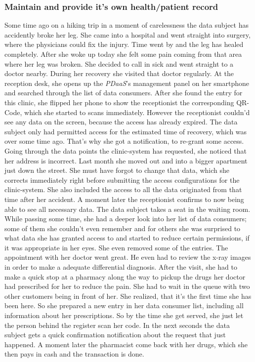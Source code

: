 \documentclass[12pt,english,a4paper,titlepage,cleardoublepage=empty,dottedtoc]{report}
\begin{document}
\subsubsection{Maintain and provide it's own health/patient
record}\label{maintain-and-provide-its-own-healthpatient-record}

Some time ago on a hiking trip in a moment of carelessness the data
subject has accidently broke her leg. She came into a hospital and went
straight into surgery, where the physicians could fix the injury. Time
went by and the leg has healed completely. After she woke up today she
felt some pain coming from that area where her leg was broken. She
decided to call in sick and went straight to a doctor nearby. During her
recovery she visited that doctor regularly. At the reception desk, she
opens up the \emph{PDaaS}'s management panel on her smartphone and
searched through the list of data consumers. After she found the entry
for this clinic, she flipped her phone to show the receptionist the
corresponding QR-Code, which she started to scans immediately. However
the receptionist couldn'd see any data on the screen, because the access
has already expired. The data subject only had permitted access for the
estimated time of recovery, which was over some time ago. That's why she
got a notification, to re-grant some access. Going through the data
points the clinic-system has requested, she noticed that her address is
incorrect. Last month she moved out and into a bigger apartment just
down the street. She must have forgot to change that data, which she
corrects immediately right before submitting the access configurations
for the clinic-system. She also included the access to all the data
originated from that time after her accident. A moment later the
receptionist confirms to now being able to see all necessary data. The
data subject takes a seat in the waiting room. While passing some time,
she had a deeper look into her list of data consumers; some of them she
couldn't even remember and for others she was surprised to what data she
has granted access to and started to reduce certain permissions, if it
was appropriate in her eyes. She even removed some of the entries. The
appointment with her doctor went great. He even had to review the x-ray
images in order to make a adequate differential diagnosis. After the
visit, she had to make a quick stop at a pharmacy along the way to
pickup the drugs her doctor had prescribed for her to reduce the pain.
She had to wait in the queue with two other customers being in front of
her. She realized, that it's the first time she has been here. So she
prepared a new entry in her data consumer list, including all
information about her prescriptions. So by the time she get served, she
just let the person behind the register scan her code. In the next
seconds the data subject gets a quick confirmation notification about
the request that just happened. A moment later the pharmacist come back
with her drugs, which she then pays in cash and the transaction is done.
\end{document}
